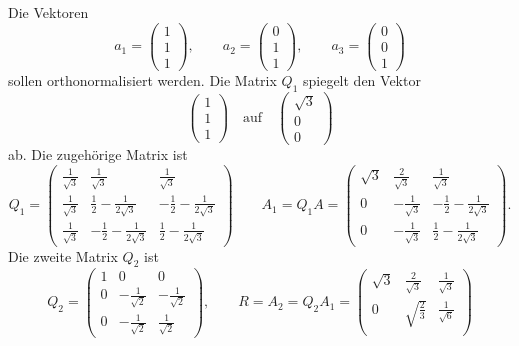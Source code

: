 \begin{beispiel}
Die Vektoren
\[
a_1 = \begin{pmatrix}1\\1\\1\end{pmatrix},
\qquad
a_2 = \begin{pmatrix}0\\1\\1\end{pmatrix},
\qquad
a_3 = \begin{pmatrix}0\\0\\1\end{pmatrix}
\]
sollen orthonormalisiert werden.
Die Matrix $Q_1$ spiegelt den Vektor 
\[
\begin{pmatrix}
1\\1\\1
\end{pmatrix}
\quad\text{auf}\quad
\begin{pmatrix}\sqrt{3}\\0\\0\end{pmatrix}
\]
ab.
Die zugehörige Matrix ist
\[
Q_1
=
\begin{pmatrix}
\frac{1}{\sqrt{3}} & \frac{1}{\sqrt{3}}          & \frac{1}{\sqrt{3}} \\
\frac{1}{\sqrt{3}} & \frac12-\frac{1}{2\sqrt{3}} & -\frac12-\frac{1}{2\sqrt{3}}\\
\frac{1}{\sqrt{3}} & -\frac12-\frac{1}{2\sqrt{3}}&\frac12-\frac1{2\sqrt{3}}
\end{pmatrix}
\qquad
A_1
=
Q_1A
=
\begin{pmatrix}
\sqrt{3} &  \frac{2}{\sqrt{3}} & \frac{1}{\sqrt{3}} \\
  0      & -\frac{1}{\sqrt{3}} & -\frac12-\frac{1}{2\sqrt{3}} \\
  0      & -\frac{1}{\sqrt{3}} & \frac12-\frac{1}{2\sqrt{3}}
\end{pmatrix}.
\]
Die zweite Matrix $Q_2$ ist
\[
Q_2
=
\begin{pmatrix}
1&0&0\\
0&-\frac{1}{\sqrt{2}} & -\frac{1}{\sqrt{2}} \\
0&-\frac{1}{\sqrt{2}} &  \frac{1}{\sqrt{2}}
\end{pmatrix},
\qquad
R
=
A_2 = Q_2A_1
=
\begin{pmatrix}
\sqrt{3} & \frac{2}{\sqrt{3}} & \frac{1}{\sqrt{3}} \\
    0    & \sqrt{\frac{2}{3}} & \frac{1}{\sqrt{6}} \\

\end{pmatrix}\]
\end{beispiel}
